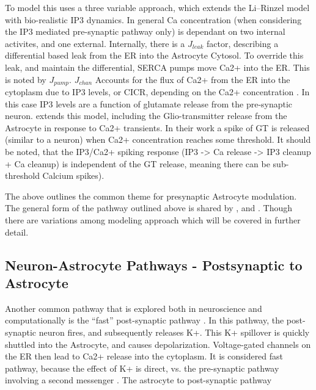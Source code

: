     To model this \cite{pitta_2009} uses a three variable approach, which
    extends the Li–Rinzel model with bio-realistic IP3 dynamics. In general Ca
    concentration (when considering the IP3 mediated pre-synaptic pathway only)
    is dependant on two internal activites, and one external. Internally, there
    is a $J_{leak}$ factor, describing a differential based leak from the ER
    into the Astrocyte Cytosol. To override this leak, and maintain the
    differential, SERCA pumps move Ca2+ into the ER. This is noted by
    $J_{pump}$. $J_{chan}$ Accounts for the flux of Ca2+ from the ER into the
    cytoplasm due to IP3 levels, or CICR, depending on the Ca2+ concentration
    \cite{pitta_2009}. In this case IP3 levels are a function of glutamate
    release from the pre-synaptic neuron.  \cite{pitta_2016} extends this model,
    including the Glio-transmitter release from the Astrocyte in response to
    Ca2+ transients. In their work a spike of GT is released (similar to a
    neuron) when Ca2+ concentration reaches some threshold. It should be noted,
    that the IP3/Ca2+ spiking response (IP3 -> Ca release -> IP3 cleanup + Ca
    cleanup) is independent of the GT release, meaning there can be
    sub-threshold Calcium spikes).

    The above outlines the common theme for presynaptic Astrocyte
    modulation. The general form of the pathway outlined above is shared by
    \cite{postnov_2009}, and \cite{wade_2011}. Though there are variations among
    modeling approach which will be covered in further detail.

    
    \subsection{Neuron-Astrocyte Pathways - Postsynaptic to Astrocyte}
    
    Another common pathway that is explored both in neuroscience and
    computationally is the ``fast'' post-synaptic pathway \cite{bassam_2015}. In
    this pathway, the post-synaptic neuron fires, and subsequently releases
    K+. This K+ spillover is quickly shuttled into the Astrocyte, and causes
    depolarization. Voltage-gated channels on the ER then lead to Ca2+ release
    into the cytoplasm. It is considered fast pathway, because the effect of K+
    is direct, vs. the pre-synaptic pathway involving a second messenger
    \cite{bassam_2015}. The astrocyte to post-synaptic pathway

